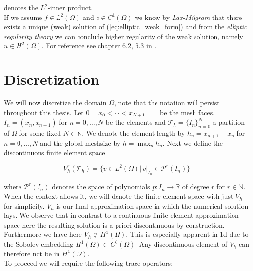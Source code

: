 denotes the $L^2$-inner product. \\
If we assume $f \in L^2(\Omega)$ and $c \in C^1(\Omega)$ we know by \textit{Lax-Milgram} 
that there exists a unique (weak) solution of (\ref{eq:elliptic_weak_form}) and from the \textit{elliptic regularity theory} we 
can conclude higher regularity of the weak solution, namely $u \in H^2(\Omega)$. For reference see chapter 6.2, 6.3 in \cite{EvansPDE}.

\section{Discretization}
\label{sec:discretization_elliptic}
We will now discretize the domain $\Omega$, note that the notation will persist throughout this thesis. 
Let $0=x_0 < \cdots < x_{N+1} = 1$ be the mesh faces, $I_n = (x_n, x_{n+1})$ for $n = 0,\ldots,N$ be the elements and $\mathcal{T}_h = \{I_n\}_{n=0}^N$ a partition
of $\Omega$ for some fixed $N\in \mathbb{N}$.
We denote the element length by $h_n = x_{n+1} - x_{n}$ for $n=0,\ldots,N$ and the global meshsize by
$h = \max_{n} h_n$.
Next we define the discontinuous finite element space
\begin{tcolorbox}[mythmstyle]
	\begin{equation}
		V_h^r(\mathcal{T}_h) = \{v \in L^2(\Omega) |\, v|_{I_n} \in \mathcal{P}^r(I_n) \}
	\end{equation}
\end{tcolorbox}
where $\mathcal{P}^r(I_n)$ denotes the space of polynomials $p:I_n \to \mathbb{R}$ of degree $r$
for $r \in \mathbb{N}$. When the context allows it, we will denote the
finite element space with just $V_h$ for simplicity.
$V_h$ is our final approximation space in which the numerical solution
lays.
We observe that in contrast to a continuous finite element approximation space
here the resulting solution is a priori discontinuous by construction.
Furthermore we have here $V_h \not\subset H^1(\Omega)$.
This is especially apparent in 1d due to the Sobolev embedding $H^1(\Omega) \subset C^0(\Omega)$.
Any discontinuous element of $V_h$ can therefore not be in $H^1(\Omega)$. \\
To proceed we will require the following trace operators:

